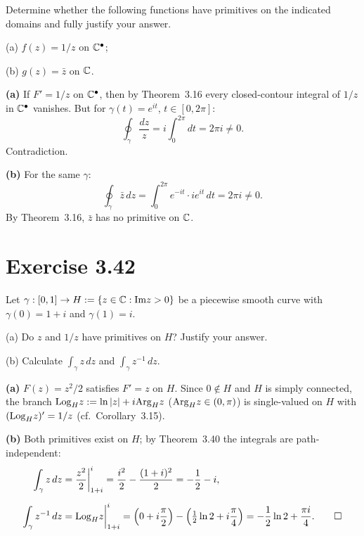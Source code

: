 \documentclass{article}
\begin{document}
Determine whether the following functions have primitives on
the indicated domains and fully justify your answer.

(a) $f(z)=1/z$ on $\mathbb{C}^\bullet$;

(b) $g(z)=\bar{z}$ on $\mathbb{C}$.

\begin{solution}
	\textbf{(a)}\;
	If $F'=1/z$ on $\mathbb{C}^\bullet$, then by Theorem~3.16
	every closed-contour integral of $1/z$ in $\mathbb{C}^\bullet$ vanishes.
	But for $\gamma(t)=e^{it}$, $t\in[0,2\pi]$:
	\[
		\oint_\gamma\frac{dz}{z}
		=i\int_0^{2\pi}dt=2\pi i\neq0.
	\]
	Contradiction.

	\medskip

	\textbf{(b)}\;
	For the same $\gamma$:
	\[
		\oint_\gamma\bar z\,dz
		=\int_0^{2\pi}e^{-it}\cdot ie^{it}\,dt=2\pi i\neq0.
	\]
	By Theorem~3.16, $\bar z$ has no primitive on $\mathbb{C}$.\qedhere
\end{solution}

\section{Exercise 3.42}

Let $\gamma : [0,1] \to H := \{z \in \mathbb{C} : \mathrm{Im} z > 0\}$ be a
piecewise smooth curve with $\gamma(0)=1+i$ and $\gamma(1)=i$.

(a) Do $z$ and $1/z$ have primitives on $H$? Justify your answer.

(b) Calculate $\int_\gamma z\,dz$ and $\int_\gamma z^{-1}\,dz$.

\begin{solution}
	\textbf{(a)}\;
	$F(z)=z^2/2$ satisfies $F'=z$ on $H$.
	Since $0\notin H$ and $H$ is simply connected, the branch
	$\mathrm{Log}_H z:=\ln|z|+i\mathrm{Arg}_H z$ ($\mathrm{Arg}_H z\in(0,\pi)$)
	is single-valued on $H$ with $(\mathrm{Log}_H z)'=1/z$
	(cf.\ Corollary~3.15).

	\medskip

	\textbf{(b)}\;
	Both primitives exist on $H$; by Theorem~3.40 the integrals
	are path-independent:
	\begin{align*}
		\int_\gamma z\,dz
		&=\frac{z^2}{2}\bigg|_{1+i}^{i}
		=\frac{i^2}{2}-\frac{(1+i)^2}{2}
		=-\frac12-i,\\[6pt]
		\int_\gamma z^{-1}\,dz
		&=\mathrm{Log}_H z\bigg|_{1+i}^{i}
		=\Bigl(0+i\frac\pi2\Bigr)
		-\Bigl(\tfrac12\ln2+i\frac\pi4\Bigr)
		=-\frac12\ln2+\frac{\pi i}{4}.\qedhere
	\end{align*}
\end{solution}
\end{document}
